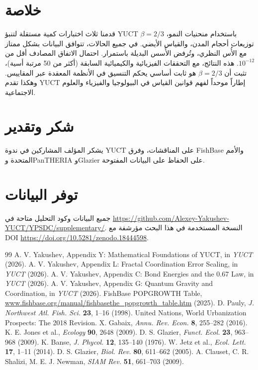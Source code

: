 \documentclass[11pt,a4paper]{article}
\begin{document}
	\section{خلاصة}
	
	قدمنا ثلاث اختبارات كمية مستقلة لتنبؤ YUCT \(\beta = 2/3\) باستخدام منحنيات النمو، توزيعات أحجام المدن، والقياس الأيضي. في جميع الحالات، تتوافق البيانات بشكل ممتاز مع الأُس النظري، وتُرفض الأُسس البديلة باستمرار. احتمال الاتفاق المصادف أقل من \(10^{-12}\). هذه النتائج، مع التحققات الفيزيائية والكيميائية السابقة (أكثر من 50 مرتبة أسية)، تثبت أن \(\beta = 2/3\) هو ثابت أساسي يحكم التنسيق في الأنظمة المعقدة عبر المقاييس. وهكذا تقدم YUCT إطاراً موحداً لفهم قوانين القياس في البيولوجيا والفيزياء والعلوم الاجتماعية.
	
	\section*{شكر وتقدير}
	
	يشكر المؤلف المشاركين في ندوة YUCT على المناقشات، وفرق FishBase والأمم المتحدة وPanTHERIA وGlazier على الحفاظ على البيانات المفتوحة.
	
	\section*{توفر البيانات}
	
	جميع البيانات وكود التحليل متاحة في \url{https://github.com/Alexey-Yakushev-YUCT/YPSDC/supplementary/}. النسخة المستخدمة في هذا البحث مؤرشفة مع DOI \url{https://doi.org/10.5281/zenodo.18444598}.
	
	\begin{thebibliography}{99}
		 A. V. Yakushev, Appendix Y: Mathematical Foundations of YUCT, in \emph{YUCT} (2026).
		 A. V. Yakushev, Appendix L: Fractal Coordination Error Scaling, in \emph{YUCT} (2026).
		 A. V. Yakushev, Appendix C: Bond Energies and the 0.67 Law, in \emph{YUCT} (2026).
		 A. V. Yakushev, Appendix G: Quantum Gravity and Coordination, in \emph{YUCT} (2026).
		 FishBase POPGROWTH Table, \url{www.fishbase.org/manual/fishbasethe_popgrowth_table.htm} (2025).
		 D. Pauly, \emph{J. Northwest Atl. Fish. Sci.} \textbf{23}, 1–16 (1998).
		 United Nations, World Urbanization Prospects: The 2018 Revision.
		 X. Gabaix, \emph{Annu. Rev. Econ.} \textbf{8}, 255–282 (2016).
		 K. E. Jones et al., \emph{Ecology} \textbf{90}, 2648 (2009).
		 D. S. Glazier, \emph{Funct. Ecol.} \textbf{23}, 963–968 (2009).
		 K. Banse, \emph{J. Phycol.} \textbf{12}, 135–140 (1976).
		 W. Jetz et al., \emph{Ecol. Lett.} \textbf{17}, 1–11 (2014).
		 D. S. Glazier, \emph{Biol. Rev.} \textbf{80}, 611–662 (2005).
		 A. Clauset, C. R. Shalizi, M. E. J. Newman, \emph{SIAM Rev.} \textbf{51}, 661–703 (2009).
	\end{thebibliography}
	
\end{document}
